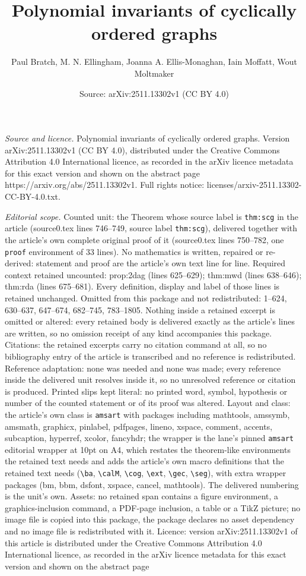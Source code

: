 \documentclass[10pt,a4paper]{amsart}
\title[Polynomial invariants of cyclically ordered graphs]{Polynomial invariants of cyclically ordered graphs}
\author{Paul Bratch, M. N. Ellingham, Joanna A. Ellis-Monaghan, Iain Moffatt, Wout Moltmaker}
\date{Source: arXiv:2511.13302v1 (CC BY 4.0)}
\begin{document}
\maketitle

\noindent\emph{Source and licence.} Polynomial invariants of cyclically ordered graphs. Version arXiv:2511.13302v1 (CC BY 4.0), distributed under the Creative Commons Attribution 4.0 International licence, as recorded in the arXiv licence metadata for this exact version and shown on the abstract page https://arxiv.org/abs/2511.13302v1. Full rights notice: licenses/arxiv-2511.13302-CC-BY-4.0.txt.\par\smallskip

\noindent\textit{Editorial scope.} Counted unit: the Theorem whose source label is \texttt{thm:scg} in the article (source0.tex lines 746--749, source label \texttt{thm:scg}), delivered together with the article's own complete original proof of it (source0.tex lines 750--782, one \texttt{proof} environment of 33 lines). No mathematics is written, repaired or re-derived: statement and proof are the article's own text line for line. Required context retained uncounted: prop:2dag (lines 625--629); thm:mwd (lines 638--646); thm:rda (lines 675--681). Every definition, display and label of those lines is retained unchanged. Omitted from this package and not redistributed: 1--624, 630--637, 647--674, 682--745, 783--1805. Nothing inside a retained excerpt is omitted or altered: every retained body is delivered exactly as the article's lines are written, so no omission receipt of any kind accompanies this package. Citations: the retained excerpts carry no citation command at all, so no bibliography entry of the article is transcribed and no reference is redistributed. Reference adaptation: none was needed and none was made; every reference inside the delivered unit resolves inside it, so no unresolved reference or citation is produced. Printed slips kept literal: no printed word, symbol, hypothesis or number of the counted statement or of its proof was altered. Layout and class: the article's own class is \texttt{amsart} with packages including mathtools, amssymb, amsmath, graphicx, pinlabel, pdfpages, lineno, xspace, comment, accents, subcaption, hyperref, xcolor, fancyhdr; the wrapper is the lane's pinned \texttt{amsart} editorial wrapper at 10pt on A4, which restates the theorem-like environments the retained text needs and adds the article's own macro definitions that the retained text needs (\texttt{\textbackslash ba}, \texttt{\textbackslash calM}, \texttt{\textbackslash cog}, \texttt{\textbackslash ext}, \texttt{\textbackslash gec}, \texttt{\textbackslash seg}), with extra wrapper packages (bm, bbm, dsfont, xspace, cancel, mathtools). The delivered numbering is the unit's own. Assets: no retained span contains a figure environment, a graphics-inclusion command, a PDF-page inclusion, a table or a TikZ picture; no image file is copied into this package, the package declares no asset dependency and no image file is redistributed with it. Licence: version arXiv:2511.13302v1 of this article is distributed under the Creative Commons Attribution 4.0 International licence, as recorded in the arXiv licence metadata for this exact version and shown on the abstract page 
\end{document}
